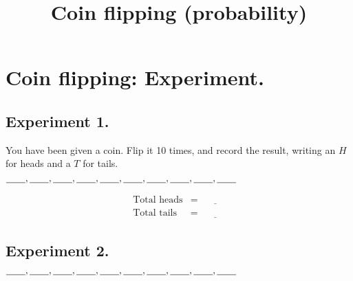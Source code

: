 \documentclass[12pt]{article}
\title{Coin flipping (probability)}
\begin{document}
\Large

\section*{Coin flipping: Experiment.}

\subsection*{Experiment 1.}

You have been given a coin.  Flip it 10 times, and record the result,
writing an $H$ for heads and a $T$ for tails.

\vspace{3ex}%
\noindent%
$\underline{\hspace{2em}},\hfill \underline{\hspace{2em}},\hfill
\underline{\hspace{2em}},\hfill \underline{\hspace{2em}},\hfill
\underline{\hspace{2em}},\hfill \underline{\hspace{2em}},\hfill
\underline{\hspace{2em}},\hfill \underline{\hspace{2em}},\hfill
\underline{\hspace{2em}},\hfill \underline{\hspace{2em}}$

\vspace{1ex}
\begin{eqnarray*}
\mbox{Total heads} & = & \underline{\hspace{2em}} \\
\mbox{Total tails} & = & \underline{\hspace{2em}}
\end{eqnarray*}

\subsection*{Experiment 2.}

\vspace{3ex}
$\underline{\hspace{2em}},\hfill \underline{\hspace{2em}},\hfill
\underline{\hspace{2em}},\hfill \underline{\hspace{2em}},\hfill
\underline{\hspace{2em}},\hfill \underline{\hspace{2em}},\hfill
\underline{\hspace{2em}},\hfill \underline{\hspace{2em}},\hfill
\underline{\hspace{2em}},\hfill \underline{\hspace{2em}}$
\end{document}
